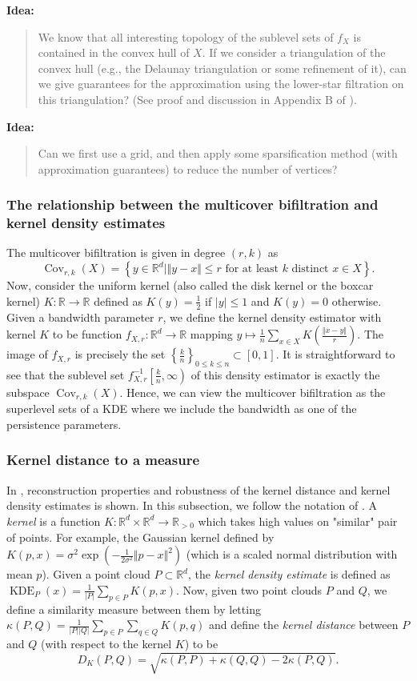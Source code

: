 \documentclass[10pt,a4paper]{article}
\theoremstyle{definition}
\newcommand{\posreals}{\ensuremath{\mathbb{R}_{>0}}}
\newcommand{\R}{\mathbb{R}}
\newenvironment{idea}{%
	\begin{tcolorbox}[colback=green, breakable, sharp corners]
		\textbf{Idea: }
		\medskip
		\begin{quote}
			\centering
}{\end{quote}\medskip\end{tcolorbox}}
\begin{document}
\begin{idea}
	We know that all interesting topology of the sublevel sets of $f_X$ is contained in the convex hull of $X$. If we consider a triangulation of the convex hull (e.g., the Delaunay triangulation or some refinement of it), can we give guarantees for the approximation using the lower-star filtration on this triangulation? (See proof and discussion in Appendix B of \autocite{Hoefgeest2022}).
\end{idea}

\begin{idea}
	Can we first use a grid, and then apply some sparsification method (with approximation guarantees) to reduce the number of vertices?
\end{idea}

\subsubsection{The relationship between the multicover bifiltration and kernel density estimates}
The multicover bifiltration is given in degree $(r,k)$ as
$$
\operatorname{Cov}_{r,k}(X) = \left\{y\in\R^d\mid\Vert y-x\Vert\leq r\text{ for at least $k$ distinct $x\in X$}\right\}.
$$
Now, consider the uniform kernel (also called the disk kernel or the boxcar kernel) $K\colon\R\to\R$ defined as $K(y)=\frac{1}{2}$ if $\vert y\vert\leq1$ and $K(y)=0$ otherwise. Given a bandwidth parameter $r$, we define the kernel density estimator with kernel $K$ to be function $f_{X,r}\colon\R^d\to\R$ mapping $y\mapsto\frac{1}{n}\sum_{x\in X}K\left(\frac{\Vert x-y\Vert}{r}\right)$. The image of $f_{X,r}$ is precisely the set $\left\{\frac{k}{n}\right\}_{0\leq k\leq n}\subset[0,1]$. It is straightforward to see that the sublevel set $f_{X,r}^{-1}\left[\frac{k}{n},\infty\right)$ of this density estimator is exactly the subspace $\operatorname{Cov}_{r,k}(X)$. Hence, we can view the multicover bifiltration as the superlevel sets of a KDE where we include the bandwidth as one of the persistence parameters.

\subsubsection{Kernel distance to a measure}
In \autocite{Phillips2013}, reconstruction properties and robustness of the kernel distance and kernel density estimates is shown. In this subsection, we follow the notation of \autocite{Phillips2013}. A \textit{kernel} is a function $K\colon\R^d\times\R^d\to\posreals$ which takes high values on "similar" pair of points. For example, the Gaussian kernel defined by $K(p,x)=\sigma^2\exp(-\frac{1}{2\sigma^2}\Vert p-x\Vert^2)$ (which is a scaled normal distribution with mean $p$). Given a point cloud $P\subset\R^d$, the \textit{kernel density estimate} is defined as $\operatorname{KDE}_P(x) = \frac{1}{|P|}\sum_{p\in P}K(p,x)$. Now, given two point clouds $P$ and $Q$, we define a similarity measure between them by letting $\kappa(P,Q)=\frac{1}{|P| |Q|}\sum_{p\in P}\sum_{q\in Q}K(p,q)$ and define the \textit{kernel distance} between $P$ and $Q$ (with respect to the kernel $K$) to be 
$$
D_K(P,Q) = \sqrt{\kappa(P,P)+\kappa(Q,Q)-2\kappa(P,Q)}.
$$
\end{document}
